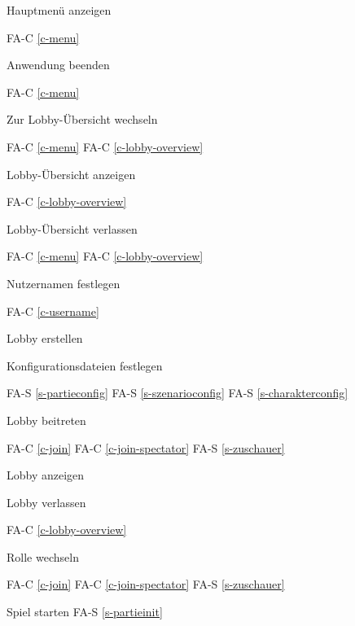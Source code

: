 Hauptmenü anzeigen

FA-C \ref{c-menu} %

Anwendung beenden

FA-C \ref{c-menu} %

Zur Lobby-Übersicht wechseln

FA-C \ref{c-menu} %
FA-C \ref{c-lobby-overview} %

Lobby-Übersicht anzeigen

FA-C \ref{c-lobby-overview} %

Lobby-Übersicht verlassen

FA-C \ref{c-menu} %
FA-C \ref{c-lobby-overview} %

Nutzernamen festlegen

FA-C \ref{c-username} %

Lobby erstellen

Konfigurationsdateien festlegen

FA-S \ref{s-partieconfig} %
FA-S \ref{s-szenarioconfig} %
FA-S \ref{s-charakterconfig} %

Lobby beitreten

FA-C \ref{c-join} %
FA-C \ref{c-join-spectator} %
FA-S \ref{s-zuschauer} %

Lobby anzeigen

Lobby verlassen

FA-C \ref{c-lobby-overview} %

Rolle wechseln

FA-C \ref{c-join} %
FA-C \ref{c-join-spectator} %
FA-S \ref{s-zuschauer} %

Spiel starten
FA-S \ref{s-partieinit} %


